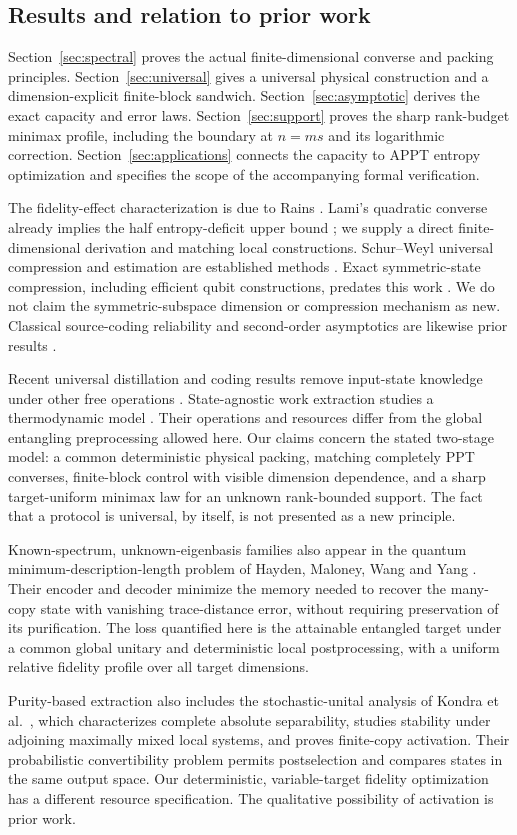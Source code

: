 \subsection{Results and relation to prior work}
Section~\ref{sec:spectral} proves the actual finite-dimensional converse and packing principles. Section~\ref{sec:universal} gives a universal physical construction and a dimension-explicit finite-block sandwich. Section~\ref{sec:asymptotic} derives the exact capacity and error laws. Section~\ref{sec:support} proves the sharp rank-budget minimax profile, including the boundary at $n=ms$ and its logarithmic correction. Section~\ref{sec:applications} connects the capacity to APPT entropy optimization and specifies the scope of the accompanying formal verification.

The fidelity-effect characterization is due to Rains \cite{rains}. Lami's quadratic converse already implies the half entropy-deficit upper bound \cite{lami}; we supply a direct finite-dimensional derivation and matching local constructions. Schur--Weyl universal compression and estimation are established methods \cite{jhhh,kw,hayashi-univ}. Exact symmetric-state compression, including efficient qubit constructions, predates this work \cite{plesch,baertschi}. We do not claim the symmetric-subspace dimension or compression mechanism as new. Classical source-coding reliability and second-order asymptotics are likewise prior results \cite{hayashi-second}.

Recent universal distillation and coding results remove input-state knowledge under other free operations \cite{takagi,tirone,llf,rizzo}. State-agnostic work extraction studies a thermodynamic model \cite{watanabe,zeng}. Their operations and resources differ from the global entangling preprocessing allowed here. Our claims concern the stated two-stage model: a common deterministic physical packing, matching completely PPT converses, finite-block control with visible dimension dependence, and a sharp target-uniform minimax law for an unknown rank-bounded support. The fact that a protocol is universal, by itself, is not presented as a new principle.

Known-spectrum, unknown-eigenbasis families also appear in the quantum minimum-description-length problem of Hayden, Maloney, Wang and Yang \cite{hayden-qmdl}. Their encoder and decoder minimize the memory needed to recover the many-copy state with vanishing trace-distance error, without requiring preservation of its purification. The loss quantified here is the attainable entangled target under a common global unitary and deterministic local postprocessing, with a uniform relative fidelity profile over all target dimensions.

Purity-based extraction also includes the stochastic-unital analysis of Kondra et al.\ \cite{kondra}, which characterizes complete absolute separability, studies stability under adjoining maximally mixed local systems, and proves finite-copy activation. Their probabilistic convertibility problem permits postselection and compares states in the same output space. Our deterministic, variable-target fidelity optimization has a different resource specification. The qualitative possibility of activation is prior work.
